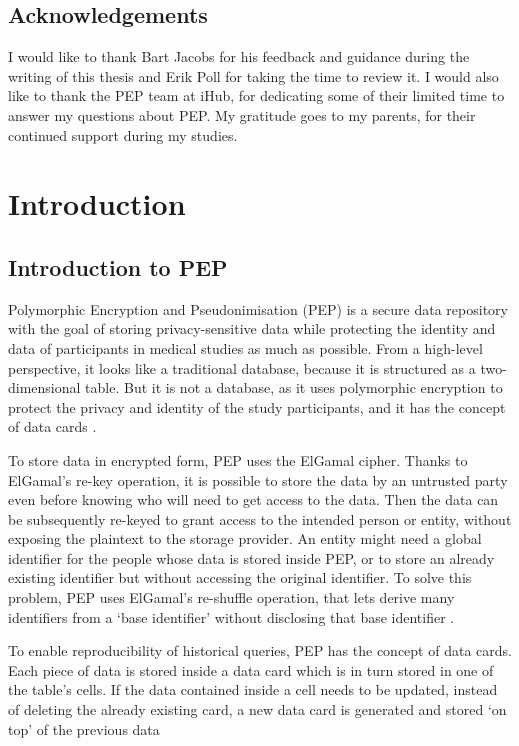\documentclass{report}
\begin{document}
\section*{Acknowledgements}
I would like to thank Bart Jacobs for his feedback and guidance during the writing of this thesis and Erik Poll for taking the time to review it. I would also like to thank the PEP
team at iHub, for dedicating some of their limited time to answer my questions about PEP. My gratitude goes to my parents, for their continued support during my studies.

\tableofcontents
\pagebreak

\chapter{Introduction}
\section{Introduction to PEP}
Polymorphic Encryption and Pseudonimisation (PEP) is a secure data repository with the goal of storing privacy-sensitive data while protecting the identity and data of participants
in medical studies as much as possible. From a high-level perspective, it looks like a traditional database, because it is structured as a two-dimensional table. But it is not a 
database, as it uses polymorphic encryption to protect the privacy and identity of the study participants, and it has the concept of data cards \cite{pep-blueprint}.\par
To store data in encrypted form, PEP uses the ElGamal cipher. Thanks to ElGamal's re-key operation, it is possible to store the data by an untrusted party even before knowing who
will need to get access to the data. Then the data can be subsequently re-keyed to grant access to the intended person or entity, without exposing the plaintext to the storage provider.
An entity might need a global identifier for the people whose data is stored inside PEP, or to store an already existing identifier but without accessing the original identifier. To
solve this problem, PEP uses ElGamal's re-shuffle operation, that lets derive many identifiers from a \enquote*{base identifier} without disclosing that base identifier \cite{peppaper}.\par
To enable reproducibility of historical queries, PEP has the concept of data cards. Each piece of data is stored inside a data card which is in turn stored in one of the table's
cells. If the data contained inside a cell needs to be updated, instead of deleting the already existing card, a new data card is generated and stored \enquote*{on top} of the previous data
\end{document}
